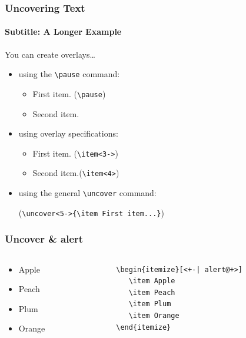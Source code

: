\documentclass{beamer}
\begin{document}
\begin{frame}[fragile]
  \frametitle{Uncovering Text}
  \framesubtitle{Subtitle: A Longer Example}

  You can create overlays\dots
  \begin{itemize}
  \item using the \verb+\pause+ command:
    \begin{itemize}
    \item
      First item. (\verb+\pause+)
      \pause
    \item    
      Second item.
    \end{itemize}
  \item
    using overlay specifications: 
    \begin{itemize}
    \item<3->
      First item. (\verb+\item<3->+)
    \item<4>
      Second item.(\verb+\item<4>+)
    \end{itemize}
  \item
    using the general \verb+\uncover+ command:

    (\verb+\uncover<5->{\item First item...}+)
    \begin{itemize}
    \end{itemize}
  \end{itemize}
\end{frame}


 
\begin{frame}[fragile]
\frametitle{Uncover \& alert}
\begin{columns}[c]
\begin{column}{.3\textwidth}
\begin{itemize}[<+-| alert@+>]
   \item Apple
   \item Peach
   \item Plum
   \item Orange
\end{itemize}
\end{column}
\begin{column}{.7\textwidth}
\begin{verbatim}
\begin{itemize}[<+-| alert@+>]
   \item Apple
   \item Peach
   \item Plum
   \item Orange
\end{itemize}
\end{verbatim}
\end{column}

\end{columns}
\end{frame}
\end{document}
